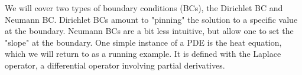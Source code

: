 We will cover two types of boundary conditions (BCs), the Dirichlet BC and Neumann BC. 
Dirichlet BCs amount to "pinning" the solution to a specific value at the boundary.
Neumann BCs are a bit less intuitive, but allow one to set the "slope" at the boundary.
One simple instance of a PDE is the heat equation, which we will return to as a running example. It is defined with the Laplace operator, a differential operator involving partial derivatives. 
